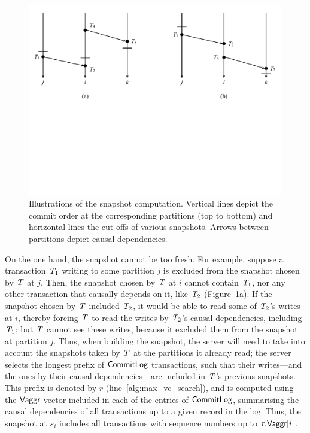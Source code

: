 \begin{figure}[t]
\includegraphics[width=\textwidth]{figures/ch4_snapshot.pdf}
\vspace{-6.5cm}
\caption{Illustrations of the snapshot computation. Vertical lines depict the
  commit order at the corresponding partitions (top to bottom) and horizontal
  lines the cut-offs of various snapshots. Arrows between partitions depict
  causal dependencies.}
\label{fig:snapshot}
\end{figure}

On the one hand, the snapshot cannot be too fresh. For example, suppose a transaction $\mathit{T}_1$ writing to some partition $j$ is excluded from the snapshot chosen by $\mathit{T}$ at $j$. Then, the snapshot chosen by $\mathit{T}$ at $i$ cannot contain $\mathit{T}_1$, nor any other transaction that causally depends on it, like $\mathit{T}_2$ (Figure~\ref{fig:snapshot}a). If the snapshot chosen by $\mathit{T}$ included $\mathit{T}_2$, it would be able to read some of $\mathit{T}_2$'s writes at $i$, thereby forcing $\mathit{T}$ to read the writes by $\mathit{T}_2$'s causal dependencies, including $\mathit{T}_1$; but $\mathit{T}$ cannot see these writes, because it excluded them from the snapshot at partition $j$. Thus, when building the snapshot, the server will need to take into account the snapshots taken by $\mathit{T}$ at the partitions it already read; the server selects the longest prefix of $\mathsf{CommitLog}$ transactions, such that their writes---and the ones by their causal dependencies---are included in $\mathit{T}$'s previous snapshots. This prefix is denoted by $r$ (line~\ref{alg:max_vc_search}), and is computed using the $\mathsf{Vaggr}$ vector included in each of the entries of $\mathsf{CommitLog}$, summarising the causal dependencies of all transactions up to a given record in the log. Thus, the snapshot at $s_i$ includes all transactions with sequence numbers up to $r.\mathsf{Vaggr}[i]$.

